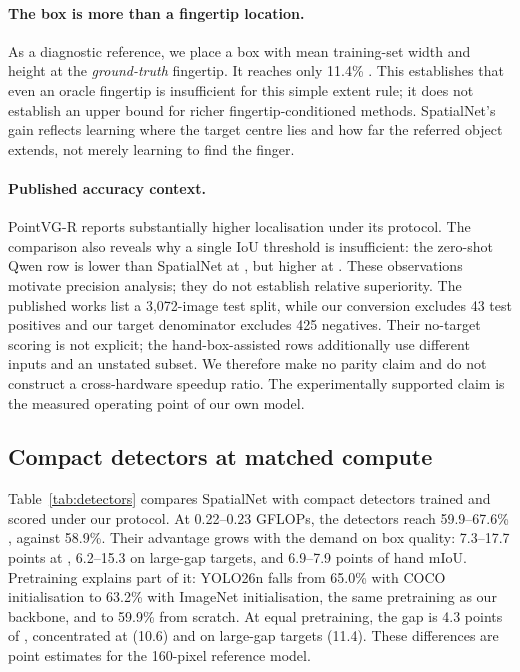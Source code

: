 \paragraph{The box is more than a fingertip location.}
As a diagnostic reference, we place a box with mean training-set width and height at the \emph{ground-truth} fingertip. It reaches only 11.4\% . This establishes that even an oracle fingertip is insufficient for this simple extent rule; it does not establish an upper bound for richer fingertip-conditioned methods. SpatialNet's gain reflects learning where the target centre lies and how far the referred object extends, not merely learning to find the finger.

\paragraph{Published accuracy context.}
PointVG-R reports substantially higher localisation under its protocol. The comparison also reveals why a single IoU threshold is insufficient: the zero-shot Qwen row is lower than SpatialNet at , but higher at . These observations motivate precision analysis; they do not establish relative superiority. The published works list a 3,072-image test split, while our conversion excludes 43 test positives and our target denominator excludes 425 negatives. Their no-target scoring is not explicit; the hand-box-assisted rows additionally use different inputs and an unstated subset. We therefore make no parity claim and do not construct a cross-hardware speedup ratio. The experimentally supported claim is the measured operating point of our own model.

\subsection{Compact detectors at matched compute}\label{sec:detectors}
Table~\ref{tab:detectors} compares SpatialNet with compact detectors trained and scored under our protocol. At 0.22--0.23 GFLOPs, the detectors reach 59.9--67.6\% , against 58.9\%. Their advantage grows with the demand on box quality: 7.3--17.7 points at , 6.2--15.3 on large-gap targets, and 6.9--7.9 points of hand mIoU. Pretraining explains part of it: YOLO26n falls from 65.0\% with COCO initialisation to 63.2\% with ImageNet initialisation, the same pretraining as our backbone, and to 59.9\% from scratch. At equal pretraining, the gap is 4.3 points of , concentrated at  (10.6) and on large-gap targets (11.4). These differences are point estimates for the 160-pixel reference model.

